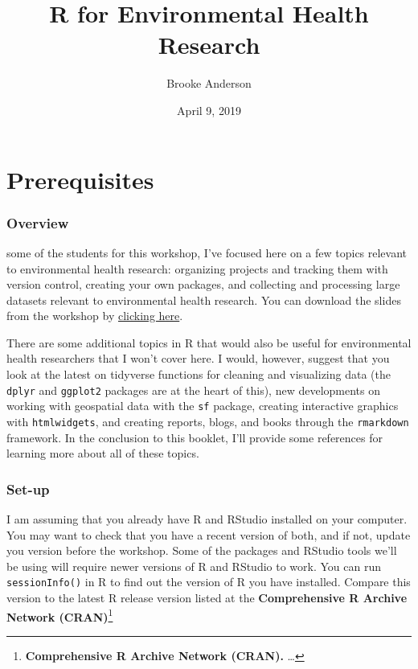 \documentclass[]{tufte-book}
\title{R for Environmental Health Research}
\author{Brooke Anderson}
\date{April 9, 2019}
\begin{document}
\maketitle



{
\setcounter{tocdepth}{1}
\tableofcontents
}

\hypertarget{prerequisites}{%
\chapter{Prerequisites}\label{prerequisites}}

\hypertarget{overview}{%
\subsection{Overview}\label{overview}}

 some of the students for this
workshop, I've focused here on a few topics relevant to environmental health
research: organizing projects and tracking them with version control, creating
your own packages, and collecting and processing large datasets relevant to
environmental health research. You can download the slides from the workshop by
\href{https://github.com/geanders/navy_public_health/raw/master/_workshop_slides/workshop_slides.pdf}{clicking
here}.

There are some additional topics in R that would also be useful for
environmental health researchers that I won't cover here. I would, however,
suggest that you look at the latest on tidyverse functions for cleaning and
visualizing data (the \texttt{dplyr} and \texttt{ggplot2} packages are at the heart of this),
new developments on working with geospatial data with the \texttt{sf} package, creating
interactive graphics with \texttt{htmlwidgets}, and creating reports, blogs, and books
through the \texttt{rmarkdown} framework. In the conclusion to this booklet, I'll
provide some references for learning more about all of these topics.

\hypertarget{set-up}{%
\subsection{Set-up}\label{set-up}}

I am assuming that you already have R and RStudio installed on your computer.
You may want to check that you have a recent version of both, and if not, update
you version before the workshop. Some of the packages and RStudio tools we'll be
using will require newer versions of R and RStudio to work. You can run
\texttt{sessionInfo()} in R to find out the version of R you have installed. Compare
this version to the latest R release version listed at the \textbf{Comprehensive R
Archive Network (CRAN)}\footnote{\textbf{Comprehensive R Archive Network (CRAN).} \ldots{}}
\end{document}
